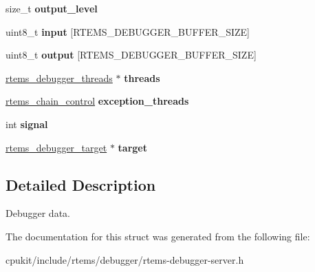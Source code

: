 \begin{DoxyCompactItemize}
\item 
\mbox{\label{structrtems__debugger__server_a45116a66811f8ef657a7c032dc062ea1}} 
size\+\_\+t {\bfseries output\+\_\+level}
\item 
\mbox{\label{structrtems__debugger__server_ad8d502ada21ca6fd176b336847d84daa}} 
uint8\+\_\+t {\bfseries input} \mbox{[}R\+T\+E\+M\+S\+\_\+\+D\+E\+B\+U\+G\+G\+E\+R\+\_\+\+B\+U\+F\+F\+E\+R\+\_\+\+S\+I\+ZE\mbox{]}
\item 
\mbox{\label{structrtems__debugger__server_a7ca90c6128c0ca15db55c68dff8019df}} 
uint8\+\_\+t {\bfseries output} \mbox{[}R\+T\+E\+M\+S\+\_\+\+D\+E\+B\+U\+G\+G\+E\+R\+\_\+\+B\+U\+F\+F\+E\+R\+\_\+\+S\+I\+ZE\mbox{]}
\item 
\mbox{\label{structrtems__debugger__server_a5b5f2963fbcf5c45f13c8bf16c435b30}} 
\mbox{\hyperlink{structrtems__debugger__threads}{rtems\+\_\+debugger\+\_\+threads}} $\ast$ {\bfseries threads}
\item 
\mbox{\label{structrtems__debugger__server_a995b31fcaddf1fbb9869e664191eb5ed}} 
\mbox{\hyperlink{unionChain__Control}{rtems\+\_\+chain\+\_\+control}} {\bfseries exception\+\_\+threads}
\item 
\mbox{\label{structrtems__debugger__server_aa0d3eac94c783303fb4e16e2bef4fe4d}} 
int {\bfseries signal}
\item 
\mbox{\label{structrtems__debugger__server_ae894027b49356f1c6cb243d65c8c426d}} 
\mbox{\hyperlink{structrtems__debugger__target}{rtems\+\_\+debugger\+\_\+target}} $\ast$ {\bfseries target}
\end{DoxyCompactItemize}


\subsection{Detailed Description}
Debugger data. 

The documentation for this struct was generated from the following file\+:\begin{DoxyCompactItemize}
\item 
cpukit/include/rtems/debugger/rtems-\/debugger-\/server.\+h\end{DoxyCompactItemize}
